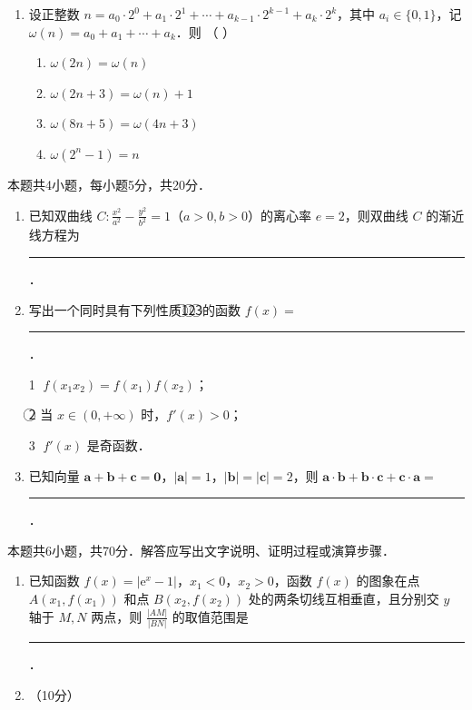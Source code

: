 \begin{description}
\begin{enumerate}[leftmargin=5pt]
        \item 设正整数 $n=a_{0}\cdot2^{0}+a_{1}\cdot2^{1}+\cdots+a_{k-1}\cdot2^{k-1}+a_{k}\cdot2^{k}$，其中 $a_{i}\in\{0,1\}$，记 $\omega(n)=a_{0}+a_{1}+\cdots+a_{k}$．则 （ ）
        \begin{enumerate}[label=\Alph*.]
            \item $\omega(2n)=\omega(n)$
            \item $\omega(2n+3)=\omega(n)+1$
            \item $\omega(8n+5)=\omega(4n+3)$
            \item $\omega(2^{n}-1)=n$
        \end{enumerate}
    \end{enumerate}

    \item[三、填空题] 本题共4小题，每小题5分，共20分．
    \begin{enumerate}[leftmargin=5pt]
      \addtocounter{enumi}{+12}
        \item 已知双曲线 $C:\frac{x^{2}}{a^{2}}-\frac{y^{2}}{b^{2}}=1$（$a>0,b>0$）的离心率 $e=2$，则双曲线 $C$ 的渐近线方程为 \rule[-0.3ex]{3em}{0.4pt}．
        \item 写出一个同时具有下列性质\textcircled{1}\textcircled{2}\textcircled{3}的函数 $f(x)=$ \rule[-0.3ex]{3em}{0.4pt}．

        \textcircled{1} $f(x_{1}x_{2})=f(x_{1})f(x_{2})$；

        \textcircled{2} 当 $x\in(0,+\infty)$ 时，$f'(x)>0$；

        \textcircled{3} $f'(x)$ 是奇函数．
        \item 已知向量 $\bm{a}+\bm{b}+\bm{c}=\bm{0}$，$|\bm{a}|=1$，$|\bm{b}|=|\bm{c}|=2$，则 $\bm{a}\cdot\bm{b}+\bm{b}\cdot\bm{c}+\bm{c}\cdot\bm{a}=$ \rule[-0.3ex]{3em}{0.4pt}．
    \end{enumerate}

    \item[四、解答题] 本题共6小题，共70分．解答应写出文字说明、证明过程或演算步骤．
    \begin{enumerate}[leftmargin=5pt]
      \addtocounter{enumi}{+15}
        \item 已知函数 $f(x)=|\mathrm{e}^{x}-1|$，$x_{1}<0$，$x_{2}>0$，函数 $f(x)$ 的图象在点 $A(x_{1},f(x_{1}))$ 和点 $B(x_{2},f(x_{2}))$ 处的两条切线互相垂直，且分别交 $y$ 轴于 $M,N$ 两点，则 $\frac{|AM|}{|BN|}$ 的取值范围是 \rule[-0.3ex]{3em}{0.4pt}．

        \item （10分）


\end{enumerate}
\end{description}
